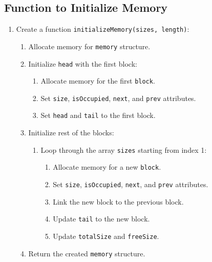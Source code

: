 {  \subsection{Function to Initialize Memory}
  \begin{enumerate}[label=\arabic*.,left=0pt]
    \item Create a function \texttt{initializeMemory(sizes, length)}:
          \begin{enumerate}[label=2.\arabic*.,left=0pt]
            \item Allocate memory for \texttt{memory} structure.
            \item Initialize \texttt{head} with the first block:
                  \begin{enumerate}[label=2.2.\arabic*.,left=0pt]
                    \item Allocate memory for the first \texttt{block}.
                    \item Set \texttt{size}, \texttt{isOccupied}, \texttt{next}, and \texttt{prev} attributes.
                    \item Set \texttt{head} and \texttt{tail} to the first block.
                  \end{enumerate}
            \item Initialize rest of the blocks:
                  \begin{enumerate}[label=2.3.\arabic*.,left=0pt]
                    \item Loop through the array \texttt{sizes} starting from index 1:
                          \begin{enumerate}[label=2.3.\arabic*.,left=0pt]
                            \item Allocate memory for a new \texttt{block}.
                            \item Set \texttt{size}, \texttt{isOccupied}, \texttt{next}, and \texttt{prev} attributes.
                            \item Link the new block to the previous block.
                            \item Update \texttt{tail} to the new block.
                            \item Update \texttt{totalSize} and \texttt{freeSize}.
                          \end{enumerate}
                  \end{enumerate}
            \item Return the created \texttt{memory} structure.
          \end{enumerate}
  \end{enumerate}

}
